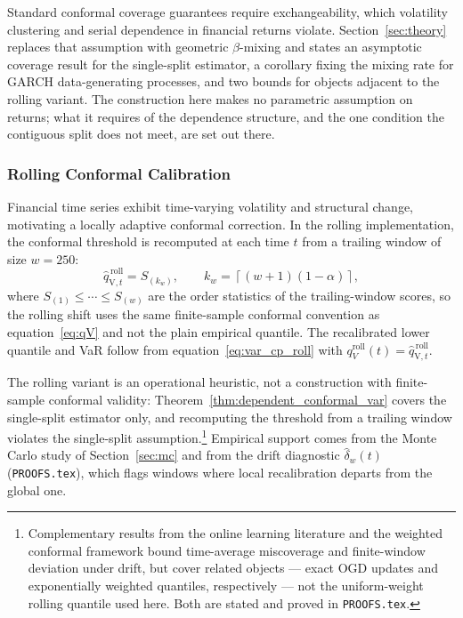 \documentclass[preprint,11pt,authoryear]{elsarticle}
\newcommand{\1}{\boldsymbol{1}}
\newcommand{\qVroll}{\hat{q}_{{\scriptscriptstyle\mathrm{V}},t}^{\,\mathrm{roll}}}
\begin{document}
Standard conformal coverage guarantees require exchangeability, which volatility
clustering and serial dependence in financial returns violate.
Section~\ref{sec:theory} replaces that assumption with geometric $\beta$-mixing
and states an asymptotic coverage result for the single-split estimator, a
corollary fixing the mixing rate for GARCH data-generating processes, and two
bounds for objects adjacent to the rolling variant. The construction here makes
no parametric assumption on returns; what it requires of the dependence
structure, and the one condition the contiguous split does not meet, are set out
there.

\subsubsection{Rolling Conformal Calibration}
\label{sec:rolling_method}

Financial time series exhibit time-varying volatility and structural change, motivating a locally adaptive conformal correction. In the rolling implementation, the conformal threshold is recomputed at each time $t$ from a trailing window of size $w = 250$:
\begin{equation}
	\label{eq:qV_roll}
	\qVroll
	=
	S_{(k_w)},
	\qquad
	k_w = \left\lceil (w+1)(1-\alpha) \right\rceil,
\end{equation}
where $S_{(1)}\le\cdots\le S_{(w)}$ are the order statistics of the trailing-window scores, so the rolling shift uses the same finite-sample conformal convention as equation~\eqref{eq:qV} and not the plain empirical quantile. The recalibrated lower quantile and VaR follow from equation~\eqref{eq:var_cp_roll} with $q_V^{\mathrm{roll}}(t) = \qVroll$.

The rolling variant is an operational heuristic, not a construction with finite-sample conformal validity: Theorem~\ref{thm:dependent_conformal_var} covers the single-split estimator only, and recomputing the threshold from a trailing window violates the single-split assumption.\footnote{Complementary results from the online learning literature \citep{zinkevich2003online} and the weighted conformal framework \citep{barber2023conformal,angelopoulos2024pid} bound time-average miscoverage and finite-window deviation under drift, but cover related objects --- exact OGD updates and exponentially weighted quantiles, respectively --- not the uniform-weight rolling quantile used here. Both are stated and proved in \texttt{PROOFS.tex}.} Empirical support comes from the Monte Carlo study of Section~\ref{sec:mc} and from the drift diagnostic $\hat\delta_w(t)$ (\texttt{PROOFS.tex}), which flags windows where local recalibration departs from the global one.
\end{document}
